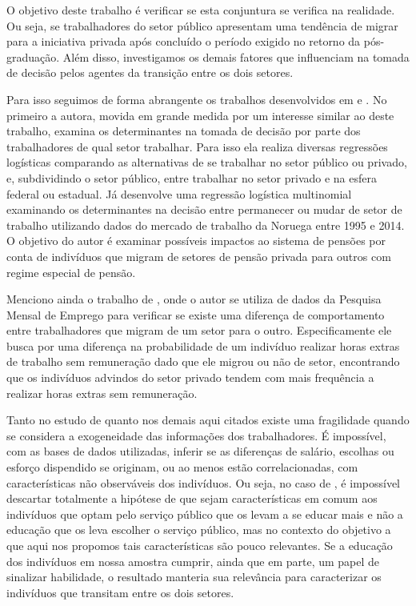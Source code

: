 \documentclass[a4paper]{article}
\begin{document}
O objetivo deste trabalho é verificar se esta conjuntura se verifica na realidade. Ou seja, se trabalhadores do setor público apresentam uma tendência de migrar para a iniciativa privada após concluído o período exigido no retorno da pós-graduação. Além disso, investigamos os demais fatores que influenciam na tomada de decisão pelos agentes da transição entre os dois setores.

Para isso seguimos de forma abrangente os trabalhos desenvolvidos em \citet{blank1985} e \citet{holts2017}. No primeiro a autora, movida em grande medida por um interesse similar ao deste trabalho, examina os determinantes na tomada de decisão por parte dos trabalhadores de qual setor trabalhar. Para isso ela realiza diversas regressões logísticas comparando as alternativas de se trabalhar no setor público ou privado, e, subdividindo o setor público, entre trabalhar no setor privado e na esfera federal ou estadual. Já \citet{holts2017} desenvolve uma regressão logística multinomial examinando os determinantes na decisão entre permanecer ou mudar de setor de trabalho utilizando dados do mercado de trabalho da Noruega entre 1995 e 2014. O objetivo do autor é examinar possíveis impactos ao sistema de pensões por conta de indivíduos que migram de setores de pensão privada para outros com regime especial de pensão.

Menciono ainda o trabalho de \citet{monte2017}, onde o autor se utiliza de dados da Pesquisa Mensal de Emprego para verificar se existe uma diferença de comportamento entre trabalhadores que migram de um setor para o outro. Especificamente ele busca por uma diferença na probabilidade de um indivíduo realizar horas extras de trabalho sem remuneração dado que ele migrou ou não de setor, encontrando que os indivíduos advindos do setor privado tendem com mais frequência a realizar horas extras sem remuneração.

Tanto no estudo de \citet{monte2017} quanto nos demais aqui citados existe uma fragilidade quando se considera a exogeneidade das informações dos trabalhadores. É impossível, com as bases de dados utilizadas, inferir se as diferenças de salário, escolhas ou esforço dispendido se originam, ou ao menos estão correlacionadas, com características não observáveis dos indivíduos. Ou seja, no caso de \citet{blank1985}, é impossível descartar totalmente a hipótese de que sejam características em comum aos indivíduos que optam pelo serviço público que os levam a se educar mais e não a educação que os leva escolher o serviço público, mas no contexto do objetivo a que aqui nos propomos tais características são pouco relevantes. Se a educação dos indivíduos em nossa amostra cumprir, ainda que em parte, um papel de sinalizar habilidade, o resultado manteria sua relevância para caracterizar os indivíduos que transitam entre os dois setores.
\end{document}
